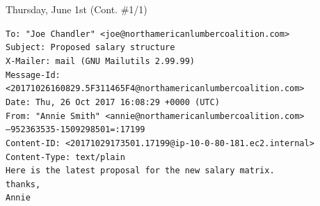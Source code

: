 \documentclass[11pt]{article}
\begin{document}
\begin{bloodorangebox}{Thursday, June 1st (Cont. \#1/1)\vspace{-2em}\begin{flushright}\large {}\end{flushright}}
\begin{itemize}
\begin{enumerate}
    \vspace{-1em}
\scriptsize{\texttt{To: "Joe Chandler" <joe@northamericanlumbercoalition.com> \\
Subject: Proposed salary structure \\
X-Mailer: mail (GNU Mailutils 2.99.99) \\
Message-Id: <20171026160829.5F311465F4@northamericanlumbercoalition.com> \\
Date: Thu, 26 Oct 2017 16:08:29 +0000 (UTC) \\
From: "Annie Smith" <annie@northamericanlumbercoalition.com>\\
--952363535-1509298501=:17199 \\
Content-ID: <20171029173501.17199@ip-10-0-80-181.ec2.internal> \\
Content-Type: text/plain\\
Here is the latest proposal for the new salary matrix. \\
thanks,\\
Annie}}
    \end{enumerate}
\end{itemize}
\end{bloodorangebox}

\begin{center}
\vspace{-0.25em}
\hspace{0.2cm}
\vspace{-0.4em}
\end{center}
\end{document}
